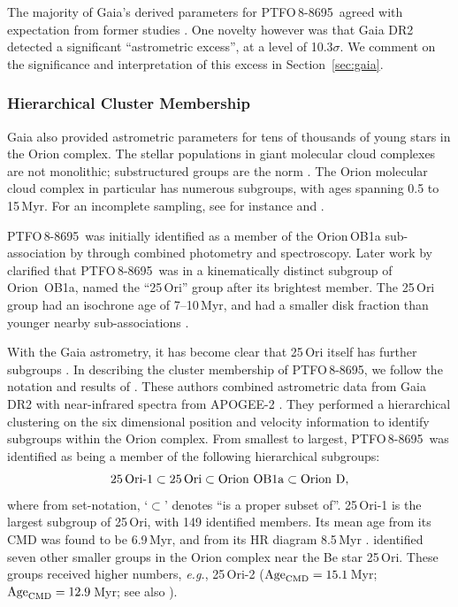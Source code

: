 \documentclass[12pt,twocolumn,tighten]{aastex62}
\newcommand{\ptfo}{PTFO$\,$8-8695}
\begin{document}
The majority of Gaia's derived parameters for \ptfo\ agreed with
expectation from former studies
\citep{briceno_cida_2005,van_eyken_ptf_2012}.  One novelty however was
that Gaia DR2 detected a significant ``astrometric excess'', at a
level of 10.3$\sigma$.  We comment on the significance and
interpretation of this excess in Section~\ref{sec:gaia}.


\subsubsection{Hierarchical Cluster Membership}
\label{subsec:hierarchical}

Gaia also provided astrometric parameters for tens of thousands of
young stars in the Orion complex.  The stellar populations in giant
molecular cloud complexes are not monolithic; substructured groups are
the norm \citep{briceno_lowmassOB_2007}.  The Orion molecular cloud
complex in particular has numerous subgroups, with ages spanning 0.5
to 15$\,$Myr. For an incomplete sampling, see for instance
\citet{briceno_cida_2005,jeffries_kinematic_2006,briceno_25_2007,kounkel_apogee2_2018}
and \citet{briceno_cidaII_2019}.

\ptfo\ was initially identified as a member of the Orion$\,$OB1a
sub-association by \citet{briceno_cida_2005} through combined
photometry and spectroscopy.  Later work by \citet{briceno_25_2007}
clarified that \ptfo\ was in a kinematically distinct subgroup of
Orion~OB1a, named the ``25$\,$Ori'' group after its brightest
member. The 25$\,$Ori group had an isochrone age of 7--10$\,$Myr, and
had a smaller disk fraction than younger nearby sub-associations
\citep{hernandez_spitzer_2007}.

With the Gaia astrometry, it has become clear that 25$\,$Ori itself
has further subgroups
\citep{kounkel_apogee2_2018,briceno_cidaII_2019}.  In describing the
cluster membership of \ptfo, we follow the notation and results of
\citet{kounkel_apogee2_2018}.  These authors combined astrometric data
from Gaia DR2 with near-infrared spectra from APOGEE-2
\citep{gunn_sdss_2006,majewski_apache_2017,blanton_sloan_2017,zasowski_target_2017,cottle_apogee2_2018}.
They performed a hierarchical clustering on the six dimensional
position and velocity information to identify subgroups within the
Orion complex.  From smallest to largest, \ptfo\ was identified
as being a member of the following hierarchical subgroups:
\begin{equation}
  {\rm 25\,Ori\text{-}1}
  \subset {\rm 25\,Ori}
  \subset {\rm Orion\ OB1a}
  \subset {\rm Orion\ D},
\end{equation}
where from set-notation, `$\subset$' denotes ``is a proper subset of''.
25$\,$Ori-1 is the largest subgroup of 25$\,$Ori, with 149 identified
members.
Its mean age from its CMD was found to be 6.9$\,$Myr, and from its HR
diagram 8.5$\,$Myr \citep{kounkel_apogee2_2018}.
\citet{kounkel_apogee2_2018} identified seven other smaller groups in
the Orion complex near the Be star 25$\,$Ori. These groups received
higher numbers, {\it e.g.}, 25$\,$Ori-2 (${\rm Age}_{\rm CMD} =15.1\,$Myr; ${\rm Age}_{\rm CMD} =12.9\,$Myr; see also \citealt{briceno_cidaII_2019}).
\end{document}
